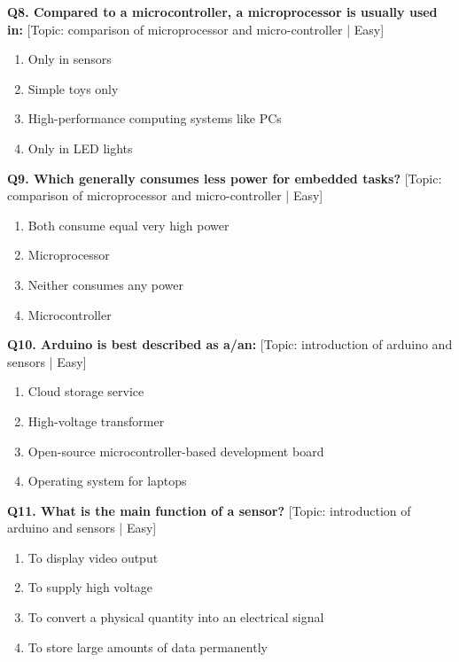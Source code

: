 \noindent\textbf{Q8. Compared to a microcontroller, a microprocessor is usually used in:} \hfill [Topic: comparison of microprocessor and micro-controller | Easy]
\begin{enumerate}[label=(\alph*),topsep=2pt,itemsep=1pt,partopsep=0pt,parsep=0pt]
    \item {Only in sensors}
    \item {Simple toys only}
    \item {High-performance computing systems like PCs}
    \item {Only in LED lights}
\end{enumerate}
\vspace{2mm}

\noindent\textbf{Q9. Which generally consumes less power for embedded tasks?} \hfill [Topic: comparison of microprocessor and micro-controller | Easy]
\begin{enumerate}[label=(\alph*),topsep=2pt,itemsep=1pt,partopsep=0pt,parsep=0pt]
    \item {Both consume equal very high power}
    \item {Microprocessor}
    \item {Neither consumes any power}
    \item {Microcontroller}
\end{enumerate}
\vspace{2mm}

\noindent\textbf{Q10. Arduino is best described as a/an:} \hfill [Topic: introduction of arduino and sensors | Easy]
\begin{enumerate}[label=(\alph*),topsep=2pt,itemsep=1pt,partopsep=0pt,parsep=0pt]
    \item {Cloud storage service}
    \item {High-voltage transformer}
    \item {Open-source microcontroller-based development board}
    \item {Operating system for laptops}
\end{enumerate}
\vspace{2mm}

\noindent\textbf{Q11. What is the main function of a sensor?} \hfill [Topic: introduction of arduino and sensors | Easy]
\begin{enumerate}[label=(\alph*),topsep=2pt,itemsep=1pt,partopsep=0pt,parsep=0pt]
    \item {To display video output}
    \item {To supply high voltage}
    \item {To convert a physical quantity into an electrical signal}
    \item {To store large amounts of data permanently}
\end{enumerate}
\vspace{2mm}


